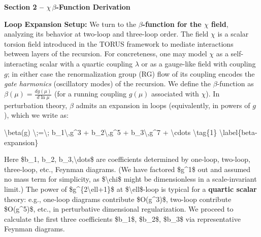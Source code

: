 \documentclass[]{article}
\begin{document}
\textbf{Section 2 -- $\chi\,$$\beta$-Function Derivation}

\textbf{Loop Expansion Setup:} We turn to the \textbf{$\beta$-function for the
$\chi$ field}, analyzing its behavior at two-loop and three-loop order. The
field $\chi$ is a scalar torsion field introduced in the TORUS framework to
mediate interactions between layers of the recursion. For concreteness, one
may model $\chi$ as a self-interacting scalar with a quartic coupling
$\lambda$ or as a gauge-like field with coupling $g$; in either case the
renormalization group (RG) flow of its coupling encodes the \emph{gate
harmonics} (oscillatory modes) of the recursion. We define the $\beta$-function
as $\beta(\mu) = \frac{d g(\mu)}{d\ln\mu}$ (for a running coupling $g(\mu)$
associated with $\chi$). In perturbation theory, $\beta$ admits an expansion in
loops (equivalently, in powers of $g$), which we write as:

\textbackslash{}beta(g) \textbackslash{};=\textbackslash{};
b\_1\textbackslash{},g\^{}3 + b\_2\textbackslash{},g\^{}5 +
b\_3\textbackslash{},g\^{}7 + \textbackslash{}cdots
\textbackslash{}tag\{1\} \textbackslash{}label\{beta-expansion\}

Here \$b\_1, b\_2, b\_3,\textbackslash{}dots\$ are coefficients
determined by one-loop, two-loop, three-loop, etc., Feynman diagrams​.
(We have factored \$g\^{}1\$ out and assumed no mass term for
simplicity, as \$\textbackslash{}chi\$ might be dimensionless in a
scale-invariant limit.) The power of \$g\^{}\{2\textbackslash{}ell+1\}\$
at \$\textbackslash{}ell\$-loop is typical for a \textbf{quartic scalar}
theory: e.g., one-loop diagrams contribute \$O(g\^{}3)\$, two-loop
contribute \$O(g\^{}5)\$, etc., in perturbative dimensional
regularization​. We proceed to calculate the first three coefficients
\$b\_1\$, \$b\_2\$, \$b\_3\$ via representative Feynman diagrams.
\end{document}
